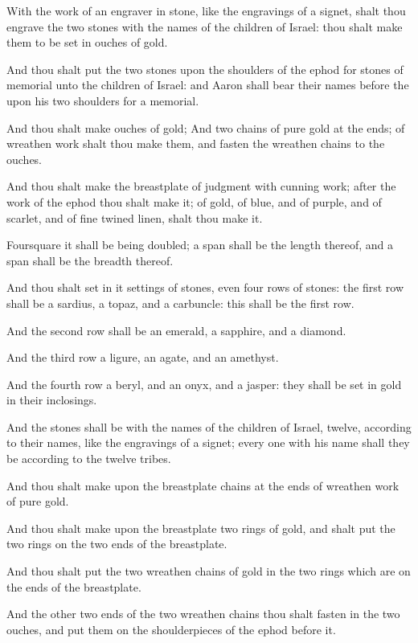 \verse With the work of an engraver in stone, like the engravings of a
signet, shalt thou engrave the two stones with the names of the
children of Israel: thou shalt make them to be set in ouches of gold.

\verse And thou shalt put the two stones upon the shoulders of the
ephod for stones of memorial unto the children of Israel: and Aaron
shall bear their names before the \LORD upon his two shoulders for a
memorial.

\verse And thou shalt make ouches of gold; \verse And two chains of pure
gold at the ends; of wreathen work shalt thou make them, and fasten
the wreathen chains to the ouches.

\verse And thou shalt make the breastplate of judgment with cunning
work; after the work of the ephod thou shalt make it; of gold, of
blue, and of purple, and of scarlet, and of fine twined linen, shalt
thou make it.

\verse Foursquare it shall be being doubled; a span shall be the length
thereof, and a span shall be the breadth thereof.

\verse And thou shalt set in it settings of stones, even four rows of
stones: the first row shall be a sardius, a topaz, and a carbuncle:
this shall be the first row.

\verse And the second row shall be an emerald, a sapphire, and a
diamond.

\verse And the third row a ligure, an agate, and an amethyst.

\verse And the fourth row a beryl, and an onyx, and a jasper: they
shall be set in gold in their inclosings.

\verse And the stones shall be with the names of the children of
Israel, twelve, according to their names, like the engravings of a
signet; every one with his name shall they be according to the twelve
tribes.

\verse And thou shalt make upon the breastplate chains at the ends of
wreathen work of pure gold.

\verse And thou shalt make upon the breastplate two rings of gold, and
shalt put the two rings on the two ends of the breastplate.

\verse And thou shalt put the two wreathen chains of gold in the two
rings which are on the ends of the breastplate.

\verse And the other two ends of the two wreathen chains thou shalt
fasten in the two ouches, and put them on the shoulderpieces of the
ephod before it.

